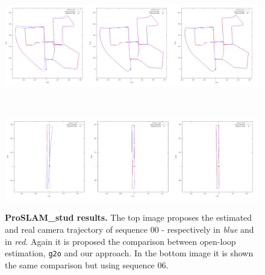 \begin{figure}[!hbt] 
    \centering
    \begin{minipage}[t!]{0.9\textwidth}
        \centering
        \includegraphics[width=\textwidth]{figures/06_use_cases/00_froslam_stud.png}
        \label{fig:froslam_stud_kitti_00}
    \end{minipage}\\
    \begin{minipage}[t!]{0.9\textwidth}
        \centering
        \includegraphics[width=\textwidth]{figures/06_use_cases/06_froslam_stud.png}
        \label{fig:froslam_stud_kitti_06}
    \end{minipage}%
    
    \caption{\textbf{ProSLAM\_stud results.} The top image proposes the estimated and real camera trajectory of sequence 00 - respectively in \textit{blue} and in \textit{red}. Again it is proposed the comparison between open-loop estimation, \texttt{g2o} and our approach. In the bottom image it is shown the same comparison but using sequence 06.} 
    \label{fig:froslam_stud_kitti}
\end{figure}

